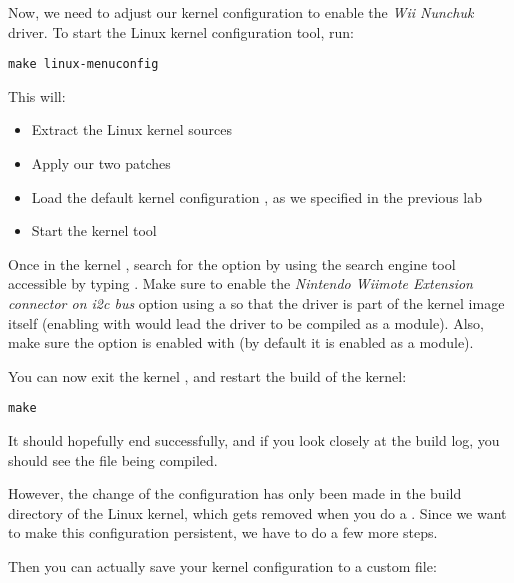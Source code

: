 Now, we need to adjust our kernel configuration to enable the {\em Wii
Nunchuk} driver. To start the Linux kernel configuration tool, run:

\begin{verbatim}
make linux-menuconfig
\end{verbatim}

This will:

\begin{itemize}
\item Extract the Linux kernel sources
\item Apply our two patches
\item Load the default kernel configuration
  , as we specified in the previous lab
\item Start the kernel  tool
\end{itemize}

Once in the kernel , search for the option
 by using the search engine tool
accessible by typing \code{/}. Make sure to enable the {\em Nintendo
  Wiimote Extension connector on i2c bus} option using a \code{*} so
that the driver is part of the kernel image itself (enabling with
 would lead the driver to be compiled as a module). Also, make
sure the  option is enabled with \code{*} (by
default it is enabled as a module).

You can now exit the kernel , and restart the build
of the kernel:

\begin{verbatim}
make
\end{verbatim}

It should hopefully end successfully, and if you look closely at the
build log, you should see the file  being compiled.

However, the change of the configuration has only been made in the
build directory of the Linux kernel, which gets removed when you do a
. Since we want to make this configuration
persistent, we have to do a few more steps.

Then you can actually save your kernel configuration to a custom file:

